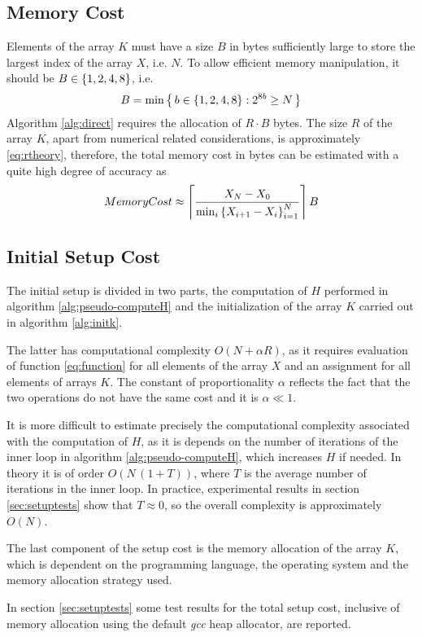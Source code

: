 \documentclass[preprint,1p,times]{elsarticle}
\begin{document}
\subsection{Memory Cost}
\label{sec:memory}
Elements of the array $K$ must have a size $B$ in bytes sufficiently large to store the largest index of the array $X$, i.e. $N$. To allow efficient memory manipulation, it should be $B\in \left \{ 1,2,4,8 \right \}$, i.e.
$$
B = \min\left \{ \,b \in \left \{ 1,2,4,8 \right \}: 2^{8b} \geq N\, \right \}
$$
Algorithm \ref{alg:direct} requires the allocation of $R\cdot B$ bytes. The size $R$ of the array $K$, apart from numerical related considerations, is approximately \eqref{eq:rtheory}, therefore, the total memory cost in bytes can be estimated with a quite high degree of accuracy as
$$
	MemoryCost \approx \left \lceil \frac{X_N-X_0}{\min_i\left \{ X_{i+1}-X_i \right \}_{i=1}^N} \right \rceil B
$$

\subsection{Initial Setup Cost}
\label{sec:setupcost}
The initial setup is divided in two parts, the computation of $H$ performed in algorithm \eqref{alg:pseudo-computeH} and the initialization of the array $K$ carried out in algorithm \eqref{alg:initk}.

The latter has computational complexity $O(N + \alpha R)$, as it requires evaluation of function \eqref{eq:function} for all elements of the array $X$ and an assignment for all elements of arrays $K$. The constant of proportionality $\alpha$ reflects the fact that the two operations do not have the same cost and it is $\alpha \ll 1$.

It is more difficult to estimate precisely the computational complexity associated with the computation of $H$, as it is depends on the number of iterations of the inner loop in algorithm \eqref{alg:pseudo-computeH}, which increases $H$ if needed. In theory it is of order $O(N\,(1+T))$, where $T$ is the average number of iterations in the inner loop. In practice, experimental results in section \eqref{sec:setuptests} show that $T\approx 0$, so the overall complexity is approximately $O(N)$.

The last component of the setup cost is the memory allocation of the array $K$, which is dependent on the programming language, the operating system and the memory allocation strategy used.

In section \eqref{sec:setuptests} some test results for the total setup cost, inclusive of memory allocation using the default \textit{gcc} heap allocator, are reported.
 
\end{document}
